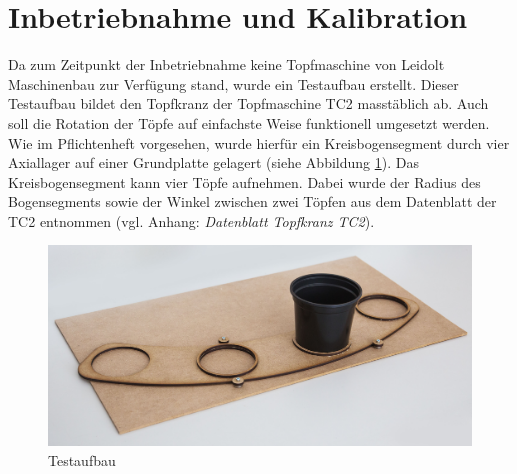\newpage
\section{Inbetriebnahme und Kalibration}
\label{inbetriebnahme}
Da zum Zeitpunkt der Inbetriebnahme keine Topfmaschine von Leidolt Maschinenbau zur Verfügung stand, wurde ein Testaufbau erstellt. Dieser Testaufbau bildet den Topfkranz der Topfmaschine TC2 masstäblich ab. Auch soll die Rotation der Töpfe auf einfachste Weise funktionell umgesetzt werden. Wie im Pflichtenheft vorgesehen, wurde hierfür ein Kreisbogensegment durch vier Axiallager auf einer Grundplatte gelagert (siehe Abbildung \ref{fig:testaufbau}). Das Kreisbogensegment kann vier Töpfe aufnehmen. Dabei wurde der Radius des Bogensegments sowie der Winkel zwischen zwei Töpfen aus dem Datenblatt der TC2 entnommen (vgl. Anhang: \textit{Datenblatt Topfkranz TC2}). 

\begin{figure}[H]
	\includegraphics[width=1\textwidth]{Illustrationen/7-Inbetriebnahme_und_Kalibration/testaufbau.jpg}
	\caption{Testaufbau}
	\label{fig:testaufbau}
\end{figure}